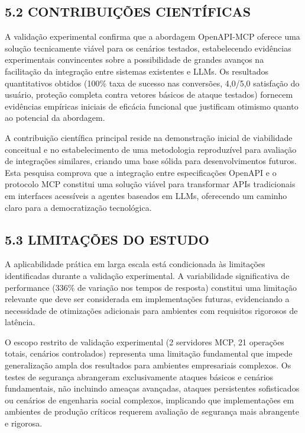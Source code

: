 \documentclass[
]{article}
\begin{document}
\subsection{5.2 CONTRIBUIÇÕES
CIENTÍFICAS}\label{contribuiuxe7uxf5es-cientuxedficas}

A validação experimental confirma que a abordagem OpenAPI-MCP oferece
uma solução tecnicamente viável para os cenários testados, estabelecendo
evidências experimentais convincentes sobre a possibilidade de grandes
avanços na facilitação da integração entre sistemas existentes e LLMs.
Os resultados quantitativos obtidos (100\% taxa de sucesso nas
conversões, 4,0/5,0 satisfação do usuário, proteção completa contra
vetores básicos de ataque testados) fornecem evidências empíricas
iniciais de eficácia funcional que justificam otimismo quanto ao
potencial da abordagem.

A contribuição científica principal reside na demonstração inicial de
viabilidade conceitual e no estabelecimento de uma metodologia
reproduzível para avaliação de integrações similares, criando uma base
sólida para desenvolvimentos futuros. Esta pesquisa comprova que a
integração entre especificações OpenAPI e o protocolo MCP constitui uma
solução viável para transformar APIs tradicionais em interfaces
acessíveis a agentes baseados em LLMs, oferecendo um caminho claro para
a democratização tecnológica.

\subsection{5.3 LIMITAÇÕES DO ESTUDO}\label{limitauxe7uxf5es-do-estudo}

A aplicabilidade prática em larga escala está condicionada às limitações
identificadas durante a validação experimental. A variabilidade
significativa de performance (336\% de variação nos tempos de resposta)
constitui uma limitação relevante que deve ser considerada em
implementações futuras, evidenciando a necessidade de otimizações
adicionais para ambientes com requisitos rigorosos de latência.

O escopo restrito de validação experimental (2 servidores MCP, 21
operações totais, cenários controlados) representa uma limitação
fundamental que impede generalização ampla dos resultados para ambientes
empresariais complexos. Os testes de segurança abrangeram exclusivamente
ataques básicos e cenários fundamentais, não incluindo ameaças
avançadas, ataques persistentes sofisticados ou cenários de engenharia
social complexos, implicando que implementações em ambientes de produção
críticos requerem avaliação de segurança mais abrangente e rigorosa.
\end{document}
